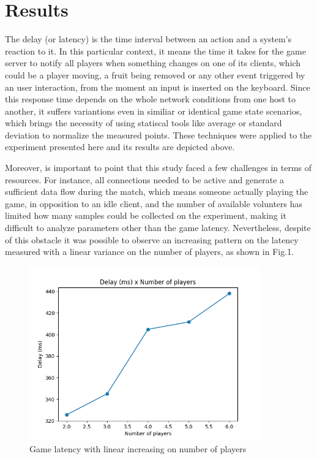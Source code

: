 \documentclass[english]{sbrt}
\begin{document}
\section{\textbf{Results}}

The delay (or latency) is the time interval between an action and a system's reaction to it. In this particular context, it means the time it takes for the game server to notify all players when something changes on one of its clients, which could be a player moving, a fruit being removed or any other event triggered by an user interaction, from the moment an input is inserted on the keyboard. Since this response time depends on the whole network conditions from one host to another, it suffers variantions even in similiar or identical game state scenarios, which brings the necessity of using statiscal tools like average or standard deviation to normalize the measured points. These techniques were applied to the experiment presented here and its results are depicted above.

Moreover, is important to point that this study faced a few challenges in terms of resources. For instance, all connections needed to be active and generate a sufficient data flow during the match, which means someone actually playing the game, in opposition to an idle client, and the number of available volunters has limited how many samples could be collected on the experiment, making it difficult to analyze parameters other than the game latency. Nevertheless, despite of this obstacle it was possible to observe an increasing pattern on the latency measured with a linear variance on the number of players, as shown in Fig.1.

\begin{figure}[H]
  \centering
  \includegraphics[width=10cm]{graphs/graph.png}
  \caption{Game latency with linear increasing on number of players}
\end{figure}
\end{document}
